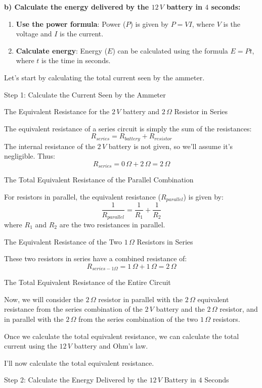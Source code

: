 \textbf{b) Calculate the energy delivered by the \(12\,V\) battery in \(4\) seconds:}

\begin{enumerate}
  \item \textbf{Use the power formula}: Power (\(P\)) is given by \(P = VI\), where \(V\) is the voltage and \(I\) is the current.
  \item \textbf{Calculate energy}: Energy (\(E\)) can be calculated using the formula \(E = Pt\), where \(t\) is the time in seconds.
\end{enumerate}

Let's start by calculating the total current seen by the ammeter.

Step 1: Calculate the Current Seen by the Ammeter

The Equivalent Resistance for the \(2\,V\) battery and \(2\,\Omega\) Resistor in Series

The equivalent resistance of a series circuit is simply the sum of the resistances:
\[ R_{series} = R_{battery} + R_{resistor} \]
The internal resistance of the \(2\,V\) battery is not given, so we'll assume it's negligible. Thus:
\[ R_{series} = 0\,\Omega + 2\,\Omega = 2\,\Omega \]

The Total Equivalent Resistance of the Parallel Combination

For resistors in parallel, the equivalent resistance (\(R_{parallel}\)) is given by:
\[ \frac{1}{R_{parallel}} = \frac{1}{R_1} + \frac{1}{R_2} \]
where \(R_1\) and \(R_2\) are the two resistances in parallel.

The Equivalent Resistance of the Two \(1\,\Omega\) Resistors in Series

These two resistors in series have a combined resistance of:
\[ R_{series-1\Omega} = 1\,\Omega + 1\,\Omega = 2\,\Omega \]

The Total Equivalent Resistance of the Entire Circuit

Now, we will consider the \(2\,\Omega\) resistor in parallel with the \(2\,\Omega\) equivalent resistance from the series combination of the \(2\,V\) battery and the \(2\,\Omega\) resistor, and in parallel with the \(2\,\Omega\) from the series combination of the two \(1\,\Omega\) resistors.

Once we calculate the total equivalent resistance, we can calculate the total current using the \(12\,V\) battery and Ohm's law.

I'll now calculate the total equivalent resistance.

Step 2: Calculate the Energy Delivered by the \(12\,V\) Battery in \(4\) Seconds

